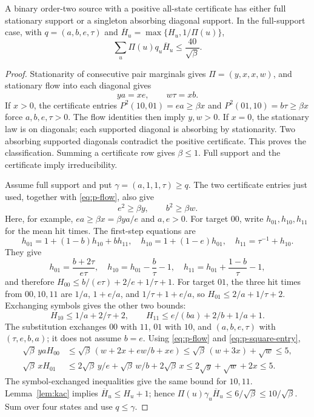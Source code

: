 \begin{lemma}\label{lem:hitting-scale}
A binary order-two source with a positive all-state certificate has either
full stationary support or a singleton absorbing diagonal support.  In the
full-support case, with $q=(a,b,e,\tau)$ and
$\overline H_u=\max\{H_u,1/\Pi(u)\}$,
\begin{equation}\label{eq:p-weighted-hitting}
 \sum_u\Pi(u)q_u\overline H_u\le\frac{40}{\sqrt\beta}.
\end{equation}
\end{lemma}
\begin{proof}
Stationarity of consecutive pair marginals gives
$\Pi=(y,x,x,w)$, and stationary flow into each diagonal gives
\begin{equation}\label{eq:p-flow}
 ya=xe,\qquad w\tau=xb.
\end{equation}
If $x>0$, the certificate entries
$P^2(10,01)=ea\ge\beta x$ and
$P^2(01,10)=b\tau\ge\beta x$ force $a,b,e,\tau>0$.
The flow identities then imply $y,w>0$.  If $x=0$, the stationary law
is on diagonals; each supported diagonal is absorbing by stationarity.
Two absorbing supported diagonals contradict the positive certificate.
This proves the classification.  Summing a certificate row gives
$\beta\le1$.  Full support and the certificate imply irreducibility.

Assume full support and put $\gamma=(a,1,1,\tau)\ge q$.
The two certificate entries just used, together with
\eqref{eq:p-flow}, also give
\begin{equation}\label{eq:p-square-entry}
 e^2\ge\beta y,\qquad b^2\ge\beta w.
\end{equation}
Here, for example, $ea\ge\beta x=\beta ya/e$ and $a,e>0$.
For target $00$, write $h_{01},h_{10},h_{11}$ for the mean hit times.
The first-step equations are
\[
 h_{01}=1+(1-b)h_{10}+bh_{11},\quad
 h_{10}=1+(1-e)h_{01},\quad h_{11}=\tau^{-1}+h_{10}.
\]
They give
\[
 h_{01}=\frac{b+2\tau}{e\tau},\quad
 h_{10}=h_{01}-\frac b\tau-1,\quad
 h_{11}=h_{01}+\frac{1-b}{\tau}-1,
\]
and therefore $H_{00}\le b/(e\tau)+2/e+1/\tau+1$.
For target $01$, the three hit times from $00,10,11$ are
$1/a$, $1+e/a$, and $1/\tau+1+e/a$, so
$H_{01}\le2/a+1/\tau+2$.
Exchanging symbols gives the other two bounds:
\[
 H_{10}\le1/a+2/\tau+2,\qquad
 H_{11}\le e/(ba)+2/b+1/a+1.
\]
The substitution exchanges $00$ with $11$, $01$ with $10$, and
$(a,b,e,\tau)$ with $(\tau,e,b,a)$; it does not assume $b=e$.
Using \eqref{eq:p-flow} and \eqref{eq:p-square-entry},
\begin{align*}
 \sqrt\beta\,yaH_{00}
 &\le\sqrt\beta\,(w+2x+ew/b+xe)
 \le\sqrt\beta\,(w+3x)+\sqrt w\le5,\\
 \sqrt\beta\,xH_{01}
 &\le2\sqrt\beta\,y/e+\sqrt\beta\,w/b+2\sqrt\beta\,x
 \le2\sqrt y+\sqrt w+2x\le5.
\end{align*}
The symbol-exchanged inequalities give the same bound for $10,11$.
Lemma~\ref{lem:kac} implies $\overline H_u\le H_u+1$; hence
$\Pi(u)\gamma_u\overline H_u\le6/\sqrt\beta\le10/\sqrt\beta$.
Sum over four states and use $q\le\gamma$.
\end{proof}

